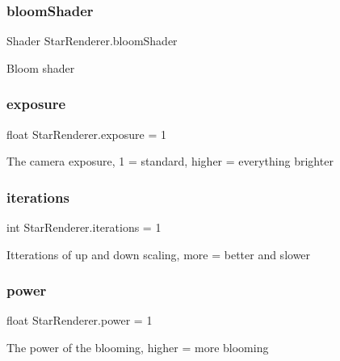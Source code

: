 \subsubsection{\texorpdfstring{bloomShader}{bloomShader}}
{\footnotesize\ttfamily Shader Star\+Renderer.\+bloom\+Shader}



Bloom shader 

\mbox{\label{class_star_renderer_a8b811c8bb3ed1994d130ba96a959d555}} 
\subsubsection{\texorpdfstring{exposure}{exposure}}
{\footnotesize\ttfamily float Star\+Renderer.\+exposure = 1}



The camera exposure, 1 = standard, higher = everything brighter 

\mbox{\label{class_star_renderer_a267117fca2d5593da99457ad77b1eedc}} 
\subsubsection{\texorpdfstring{iterations}{iterations}}
{\footnotesize\ttfamily int Star\+Renderer.\+iterations = 1}



Itterations of up and down scaling, more = better and slower 

\mbox{\label{class_star_renderer_a79c1cafe6e1ac487b3480a7aa9321310}} 
\subsubsection{\texorpdfstring{power}{power}}
{\footnotesize\ttfamily float Star\+Renderer.\+power = 1}



The power of the blooming, higher = more blooming 

\mbox{\label{class_star_renderer_a28014be558366230486c585403774a47}} 
